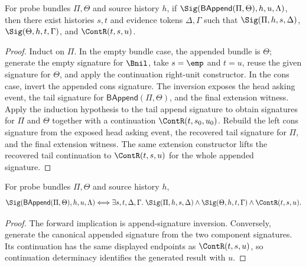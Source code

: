 \begin{theorem}
\label{thm:signature-generation-bundle-append-inversion}
For probe bundles $\Pi,\Theta$ and source history $h$, if
$\Sig(\mathsf{BAppend}(\Pi,\Theta),h,u,\Lambda)$, then there exist histories
$s,t$ and evidence tokens $\Delta,\Gamma$ such that
$\Sig(\Pi,h,s,\Delta)$, $\Sig(\Theta,h,t,\Gamma)$, and $\ContR(t,s,u)$.
\end{theorem}
\begin{proof}
Induct on $\Pi$. In the empty bundle case, the appended bundle is $\Theta$;
generate the empty signature for $\Bnil$, take $s=\emp$ and $t=u$, reuse the
given signature for $\Theta$, and apply the continuation right-unit
constructor. In the cons case, invert the appended cons signature. The
inversion exposes the head asking event, the tail signature for
$\mathsf{BAppend}(\Pi,\Theta)$, and the final extension witness. Apply the
induction hypothesis to the tail append signature to obtain signatures for
$\Pi$ and $\Theta$ together with a continuation $\ContR(t,s_0,u_0)$. Rebuild
the left cons signature from the exposed head asking event, the recovered tail
signature for $\Pi$, and the final extension witness. The same extension
constructor lifts the recovered tail continuation to $\ContR(t,s,u)$ for the
whole appended signature.
\end{proof}

\begin{theorem}
\label{thm:signature-bundleappend-decomposition}
For probe bundles $\Pi,\Theta$ and source history $h$,
$$
\Sig(\mathsf{BAppend}(\Pi,\Theta),h,u,\Lambda)
\Longleftrightarrow
\exists s,t,\Delta,\Gamma.\;
\Sig(\Pi,h,s,\Delta)\land
\Sig(\Theta,h,t,\Gamma)\land
\ContR(t,s,u).
$$
\end{theorem}
\begin{proof}
The forward implication is append-signature inversion. Conversely, generate
the canonical appended signature from the two component signatures. Its
continuation has the same displayed endpoints as $\ContR(t,s,u)$, so
continuation determinacy identifies the generated result with $u$.
\end{proof}

